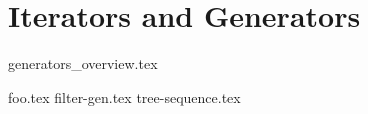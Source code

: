 \documentclass{exam}
\begin{document}
\section{Iterators and Generators}
{generators_overview.tex}
\begin{questions}
	{foo.tex}
	{filter-gen.tex}
	{tree-sequence.tex}
\end{questions}
\end{document}
